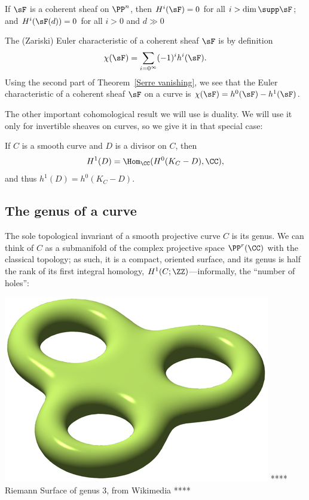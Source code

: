 \begin{theorem}\label{Serre vanishing} If $\sF$ is a coherent sheaf on $\PP^n$, then
$H^{i}(\sF)= 0$ for all $i>\dim \supp \sF$; and  $H^{i}(\sF(d))= 0$ for all $i>0$ and $d\gg 0$  
\end{theorem}

The (Zariski) Euler characteristic of a coherent sheaf $\sF$ is by definition 
$$
\chi(\sF) = \sum_{i=0^\infty} (-1)^ih^i(\sF).
$$
Using the second part of Theorem~\ref{Serre vanishing}, we see that the Euler characteristic of a coherent sheaf $\sF$ on a curve
 is  $\chi(\sF) = h^0(\sF) - h^1(\sF)$.
 
 The other important cohomological result we will use is duality. We will use it only for invertible sheaves on curves, so we give it in
 that special case:
 
\begin{theorem}\label{sd}
If $C$ is a smooth curve and $D$ is a divisor on $C$, then
$$
H^1(D) =\Hom_\CC(H^0(K_C-D), \CC),
$$
and thus $h^1(D) = h^0(K_C-D)$.
\end{theorem}

\subsection{The genus of a curve}

The sole topological invariant of a smooth projective curve $C$ is its genus. We can think of $C$ as a submanifold of the complex projective space $\PP^r(\CC)$ with the classical topology; as such, it is a compact, oriented surface, and its genus is half the rank of its first integral homology, $H^{1}(C; \ZZ)$---informally, the ``number of holes'':

\includegraphics[scale = 1]{RiemannSurface}
**** Riemann Surface of genus 3, from Wikimedia ****

